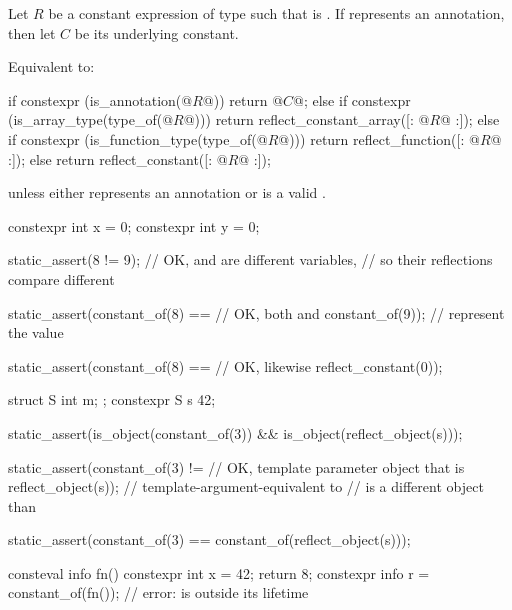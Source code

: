 \begin{itemdescr}
\pnum
Let $R$ be a constant expression of type 
such that  is .
If  represents an annotation,
then let $C$ be its underlying constant.

\pnum
\effects
Equivalent to:
\begin{codeblock}
if constexpr (is_annotation(@$R$@)) {
  return @$C$@;
} else if constexpr (is_array_type(type_of(@$R$@))) {
  return reflect_constant_array([: @$R$@ :]);
} else if constexpr (is_function_type(type_of(@$R$@))) {
  return reflect_function([: @$R$@ :]);
} else {
  return reflect_constant([: @$R$@ :]);
}
\end{codeblock}

\pnum
\throws
{} unless
either  represents an annotation or
\tcode{[: $R$ :]} is a valid
.

\pnum
\begin{example}
\begin{codeblock}
constexpr int x = 0;
constexpr int y = 0;

static_assert(^^x != ^^y);                      // OK,  and  are different variables,
                                                // so their reflections compare different

static_assert(constant_of(^^x) ==               // OK, both  and
              constant_of(^^y));                //  represent the value 

static_assert(constant_of(^^x) ==               // OK, likewise
              reflect_constant(0));

struct S { int m; };
constexpr S s {42};

static_assert(is_object(constant_of(^^s)) &&
              is_object(reflect_object(s)));

static_assert(constant_of(^^s) !=               // OK, template parameter object that is
              reflect_object(s));               // template-argument-equivalent to 
                                                // is a different object than 

static_assert(constant_of(^^s) ==
              constant_of(reflect_object(s)));

consteval info fn() {
  constexpr int x = 42;
  return ^^x;
}
constexpr info r = constant_of(fn());           // error:  is outside its lifetime
\end{codeblock}
\end{example}
\end{itemdescr}

